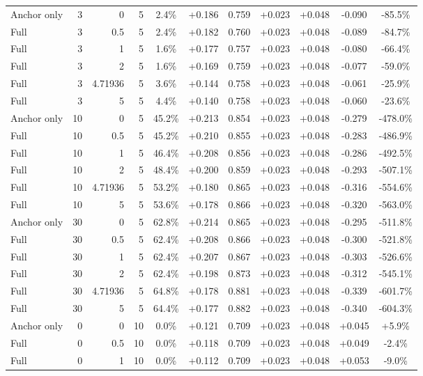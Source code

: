 \begin{table}[htbp]
\begin{tabular}{lrrrccccccc}
Anchor only & 3 & 0 & 5 & 2.4\% & +0.186 & 0.759 & +0.023 & +0.048 & -0.090 & -85.5\% \\
Full & 3 & 0.5 & 5 & 2.4\% & +0.182 & 0.760 & +0.023 & +0.048 & -0.089 & -84.7\% \\
Full & 3 & 1 & 5 & 1.6\% & +0.177 & 0.757 & +0.023 & +0.048 & -0.080 & -66.4\% \\
Full & 3 & 2 & 5 & 1.6\% & +0.169 & 0.759 & +0.023 & +0.048 & -0.077 & -59.0\% \\
Full & 3 & 4.71936 & 5 & 3.6\% & +0.144 & 0.758 & +0.023 & +0.048 & -0.061 & -25.9\% \\
Full & 3 & 5 & 5 & 4.4\% & +0.140 & 0.758 & +0.023 & +0.048 & -0.060 & -23.6\% \\
Anchor only & 10 & 0 & 5 & 45.2\% & +0.213 & 0.854 & +0.023 & +0.048 & -0.279 & -478.0\% \\
Full & 10 & 0.5 & 5 & 45.2\% & +0.210 & 0.855 & +0.023 & +0.048 & -0.283 & -486.9\% \\
Full & 10 & 1 & 5 & 46.4\% & +0.208 & 0.856 & +0.023 & +0.048 & -0.286 & -492.5\% \\
Full & 10 & 2 & 5 & 48.4\% & +0.200 & 0.859 & +0.023 & +0.048 & -0.293 & -507.1\% \\
Full & 10 & 4.71936 & 5 & 53.2\% & +0.180 & 0.865 & +0.023 & +0.048 & -0.316 & -554.6\% \\
Full & 10 & 5 & 5 & 53.6\% & +0.178 & 0.866 & +0.023 & +0.048 & -0.320 & -563.0\% \\
Anchor only & 30 & 0 & 5 & 62.8\% & +0.214 & 0.865 & +0.023 & +0.048 & -0.295 & -511.8\% \\
Full & 30 & 0.5 & 5 & 62.4\% & +0.208 & 0.866 & +0.023 & +0.048 & -0.300 & -521.8\% \\
Full & 30 & 1 & 5 & 62.4\% & +0.207 & 0.867 & +0.023 & +0.048 & -0.303 & -526.6\% \\
Full & 30 & 2 & 5 & 62.4\% & +0.198 & 0.873 & +0.023 & +0.048 & -0.312 & -545.1\% \\
Full & 30 & 4.71936 & 5 & 64.8\% & +0.178 & 0.881 & +0.023 & +0.048 & -0.339 & -601.7\% \\
Full & 30 & 5 & 5 & 64.4\% & +0.177 & 0.882 & +0.023 & +0.048 & -0.340 & -604.3\% \\
Anchor only & 0 & 0 & 10 & 0.0\% & +0.121 & 0.709 & +0.023 & +0.048 & +0.045 & +5.9\% \\
Full & 0 & 0.5 & 10 & 0.0\% & +0.118 & 0.709 & +0.023 & +0.048 & +0.049 & -2.4\% \\
Full & 0 & 1 & 10 & 0.0\% & +0.112 & 0.709 & +0.023 & +0.048 & +0.053 & -9.0\% \\

\end{tabular}
\end{table}
